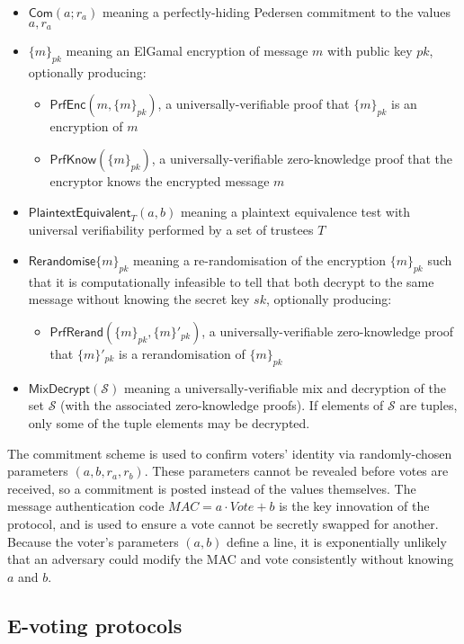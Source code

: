 \documentclass[11pt,twoside,a4paper]{article}
\newcommand{\commit}{\mathsf{Com}}
\newcommand{\PrfEnc}{\mathsf{PrfEnc}}
\newcommand{\PrfKnow}{\mathsf{PrfKnow}}
\newcommand{\rerand}{\mathsf{Rerandomise}}
\newcommand{\PrfRerand}{\mathsf{PrfRerand}}
\newcommand{\MixDec}{\mathsf{MixDecrypt}}
\newcommand{\pet}{\mathsf{PlaintextEquivalent}}
\theoremstyle{definition}
\begin{document}
\begin{itemize}
	\item $\commit(a;r_a)$ meaning a perfectly-hiding Pedersen commitment to the values $a, r_a$
	\item $\{m\}_{pk}$ meaning an ElGamal encryption of message $m$ with public key $pk$, optionally producing:
	\begin{itemize}
		\item $\PrfEnc(m, \{m\}_{pk})$, a universally-verifiable proof that $\{m\}_{pk}$ is an encryption of $m$
		\item $\PrfKnow(\{m\}_{pk})$, a universally-verifiable zero-knowledge proof that the encryptor knows the encrypted message $m$
	\end{itemize}
	\item $\pet_T(a, b)$ meaning a plaintext equivalence test with universal verifiability performed by a set of trustees $T$
	\item $\rerand\{m\}_{pk}$ meaning a re-randomisation of the encryption $\{m\}_{pk}$ such that it is computationally infeasible to tell that both decrypt to the same message without knowing the secret key $sk$, optionally producing:
	\begin{itemize}
		\item $\PrfRerand(\{m\}_{pk}, \{m\}'_{pk})$, a universally-verifiable zero-knowledge proof that $\{m\}'_{pk}$ is a rerandomisation of $\{m\}_{pk}$
	\end{itemize}
	\item $\MixDec(\mathcal{S})$ meaning a universally-verifiable mix and decryption of the set $\mathcal{S}$ (with the associated zero-knowledge proofs). If elements of $\mathcal{S}$ are tuples, only some of the tuple elements may be decrypted.
\end{itemize}

The commitment scheme is used to confirm voters' identity via randomly-chosen parameters \((a, b, r_a, r_b)\). These parameters cannot be revealed before votes are received, so a commitment is posted instead of the values themselves. The message authentication code \(MAC = a\cdot Vote+b\) is the key innovation of the protocol, and is used to ensure a vote cannot be secretly swapped for another. Because the voter's parameters \((a, b)\) define a line, it is exponentially unlikely that an adversary could modify the MAC and vote consistently without knowing \(a\) and \(b\).
\subsection{E-voting protocols}
\end{document}
